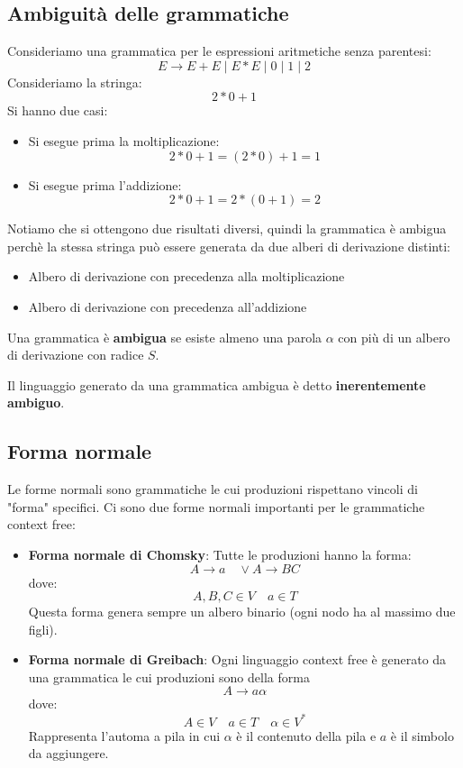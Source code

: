 \documentclass[a4paper]{article}
\begin{document}
\subsection{Ambiguità delle grammatiche}
\begin{example}
  Consideriamo una grammatica per le espressioni aritmetiche senza parentesi:
  \[
    E \to E + E \;|\; E * E \;|\; 0 \;|\; 1 \;|\; 2
  \] 
  Consideriamo la stringa:
  \[
    2 * 0 + 1
  \]
  Si hanno due casi:
  \begin{itemize}
    \item Si esegue prima la moltiplicazione:
      \[
        2 * 0 + 1 = (2 * 0) + 1 = 1
      \] 
    \item Si esegue prima l'addizione:
      \[
        2 * 0 + 1 = 2 * (0 + 1) = 2
      \]
  \end{itemize}
  Notiamo che si ottengono due risultati diversi, quindi la grammatica è ambigua
  perchè la stessa stringa può essere generata da due alberi di derivazione distinti:
  \begin{itemize}
    \item Albero di derivazione con precedenza alla moltiplicazione
      \label{03-11-D4} 
    \item Albero di derivazione con precedenza all'addizione
      \label{03-11-D5}
  \end{itemize}
\end{example}

\begin{definition}[Ambiguità]
  Una grammatica è \textbf{ambigua} se esiste almeno una parola \( \alpha \) con più
  di un albero di derivazione con radice \( S \).

  Il linguaggio generato da una grammatica ambigua è detto \textbf{inerentemente ambiguo}.
\end{definition}

\subsection{Forma normale}
Le forme normali sono grammatiche le cui produzioni rispettano vincoli di "forma"
specifici. Ci sono due forme normali importanti per le grammatiche context free:
\begin{itemize}
  \item \textbf{Forma normale di Chomsky}: Tutte le produzioni hanno la forma:
    \[
      A \to a \quad \vee A \to BC
    \] 
    dove:
    \[
      A, B, C \in V \quad a \in T
    \] 
    Questa forma genera sempre un albero binario (ogni nodo ha al massimo due figli).

  \item \textbf{Forma normale di Greibach}: Ogni linguaggio context free è generato
    da una grammatica le cui produzioni sono della forma
    \[
      A \to a \alpha
    \] 
    dove:
    \[
      A \in V \quad a \in T \quad \alpha \in V^*
    \]
    Rappresenta l'automa a pila in cui \( \alpha \) è il contenuto della pila e
    \( a \) è il simbolo da aggiungere.
\end{itemize}
\end{document}
